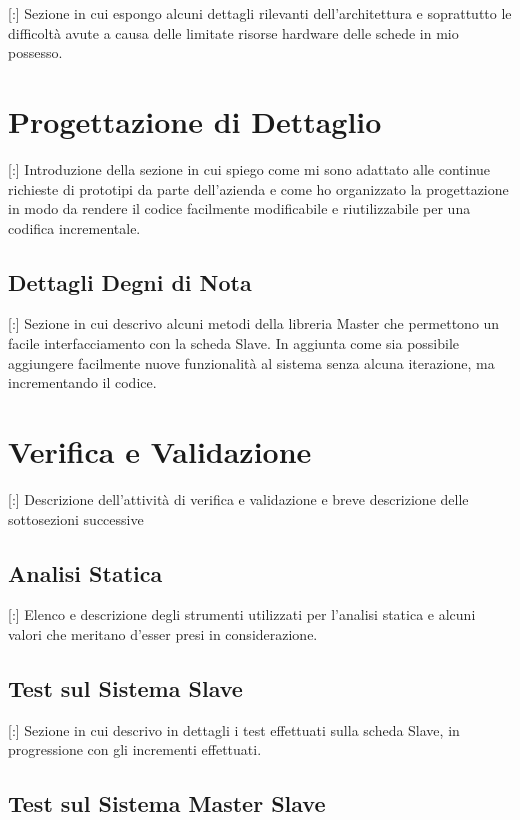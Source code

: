 \documentclass[11pt]{book}              %
\begin{document}
[:] Sezione in cui espongo alcuni dettagli rilevanti dell'architettura e soprattutto le difficoltà avute a causa delle limitate risorse hardware delle schede in mio possesso.

\section{Progettazione di Dettaglio}

[:] Introduzione della sezione in cui spiego come mi sono adattato alle continue richieste di prototipi da parte dell'azienda e come ho organizzato la progettazione in modo da rendere il codice facilmente modificabile e riutilizzabile per una codifica incrementale.

\subsection{Dettagli Degni di Nota}

[:] Sezione in cui descrivo alcuni metodi della libreria Master che permettono un facile interfacciamento con la scheda Slave. In aggiunta come sia possibile aggiungere facilmente nuove funzionalità al sistema senza alcuna iterazione, ma incrementando il codice.

\section{Verifica e Validazione}

[:] Descrizione dell'attività di verifica e validazione e breve descrizione delle sottosezioni successive

\subsection{Analisi Statica}

[:] Elenco e descrizione degli strumenti utilizzati per l'analisi statica e alcuni valori che meritano d'esser presi in considerazione.

\subsection{Test sul Sistema Slave}

[:] Sezione in cui descrivo in dettagli i test effettuati sulla scheda Slave, in progressione con gli incrementi effettuati.

\subsection{Test sul Sistema Master Slave}
\end{document}
